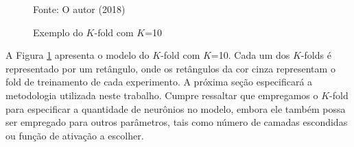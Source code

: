   \begin{figure}
    \centering
    \caption[Exemplo do $K$-fold]{Exemplo do $K$-fold com $K$=10}
    \label{fig:k-fold}

    \begin{center}
        Fonte: O autor (2018)
    \end{center}
\end{figure}

  A Figura \ref{fig:k-fold} apresenta o modelo do $K$-fold com $K$=10. Cada um dos $K$-folds é representado por um retângulo, onde os retângulos da cor cinza representam o fold de treinamento de cada experimento.
  A próxima seção especificará a metodologia utilizada neste trabalho. Cumpre ressaltar que empregamos o $K$-fold para especificar a quantidade de neurônios no modelo, embora ele também possa ser empregado para outros parâmetros, tais como número de camadas escondidas ou função de ativação a escolher.

